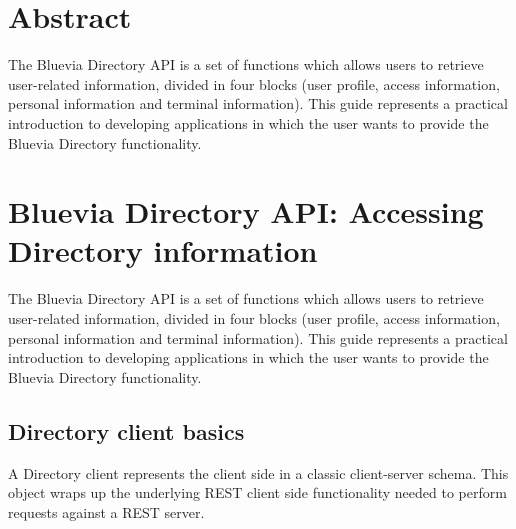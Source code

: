 \hypertarget{blv_directory_guide_directory_abstract_sec}{}\section{Abstract}\label{blv_directory_guide_directory_abstract_sec}
The Bluevia Directory API is a set of functions which allows users to retrieve user-\/related information, divided in four blocks (user profile, access information, personal information and terminal information). This guide represents a practical introduction to developing applications in which the user wants to provide the Bluevia Directory functionality.\hypertarget{blv_directory_guide_blv_directory_api_retrievings_ads_sec}{}\section{Bluevia Directory API: Accessing Directory information}\label{blv_directory_guide_blv_directory_api_retrievings_ads_sec}
The Bluevia Directory API is a set of functions which allows users to retrieve user-\/related information, divided in four blocks (user profile, access information, personal information and terminal information). This guide represents a practical introduction to developing applications in which the user wants to provide the Bluevia Directory functionality.\hypertarget{blv_directory_guide_directory_client_basics_sec}{}\subsection{Directory client basics}\label{blv_directory_guide_directory_client_basics_sec}
A Directory client represents the client side in a classic client-\/server schema. This object wraps up the underlying REST client side functionality needed to perform requests against a REST server.

